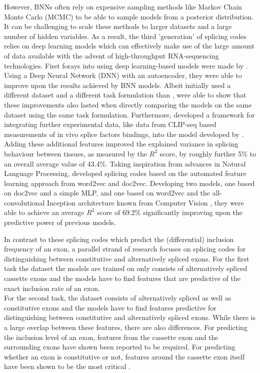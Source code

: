 However, BNNs often rely on expensive sampling methods like Markov Chain Monte Carlo (MCMC) to be able to sample models from a posterior distribution. It can be challenging to scale these methods to larger datasets and a large number of hidden variables.
As a result, the third 'generation' of splicing codes relies on deep learning models which can effectively make use of the large amount of data available with the advent of high-throughput RNA-sequencing technologies. First forays into using deep learning-based models were made by \cite{leung2014}. Using a Deep Neural Network (DNN) with an autoencoder, they were able to improve upon the results achieved by BNN models. Albeit \cite{leung2014} initially used a different dataset and a different task formulation than \cite{bnnsplicing}, \cite{jha} were able to show that these improvements also lasted when directly comparing the models on the same dataset using the same task formulation. Furthermore, \cite{jha} developed a framework for integrating further experimental data, like data from CLIP-seq based measurements of in vivo splice factors bindings, into the model developed by \cite{leung2014}. Adding these additional features improved the explained variance in splicing behaviour between tissues, as measured by the $R^2$ score, by roughly further 5\% to an overall average value of 43.4\%.
Taking inspiration from advances in Natural Language Processing, \cite{d2vsplicing} developed splicing codes based on the automated feature learning approach from word2vec and doc2vec. Developing two models, one based on doc2vec and a simple MLP, and one based on word2vec and the all-convolutional Inception architecture known from Computer Vision \cite{inception}, they were able to achieve an average $R^2$ score of 69.2\% significantly improving upon the predictive power of previous models.


In contrast to these splicing codes which predict the (differential) inclusion frequency of an exon, a parallel strand of research focuses on splicing codes for distinguishing between constitutive and alternatively spliced exons. For the first task the dataset the models are trained on only consists of alternatively spliced cassette exons and the models have to find features that are predictive of the exact inclusion rate of an exon.\\
For the second task, the dataset consists of alternatively spliced as well as constitutive exons and the models have to find features predictive for distinguishing between constitutive and alternatively spliced exons.
While there is a large overlap between these features, there are also differences.
For predicting the inclusion level of an exon, features from the cassette exon and the surrounding exons have shown been reported to be required. \cite{splicingcodegood1} For predicting whether an exon is constitutive or not, features around the cassette exon itself have been shown to be the most critical \cite{featurearoundexonjunc}. 

